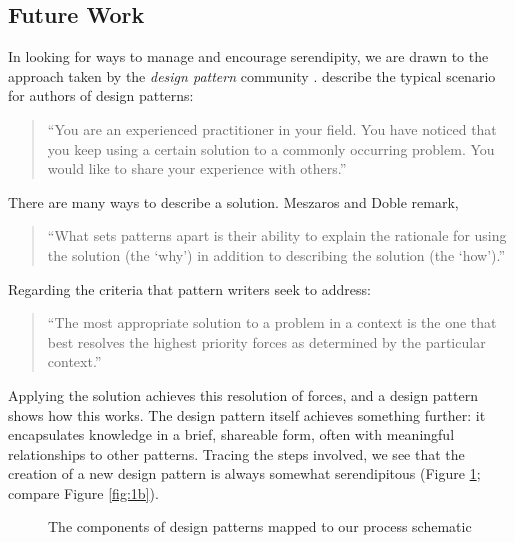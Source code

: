 \subsection{Future Work} \label{sec:futurework} \label{sec:hatching}

In looking for ways to manage and encourage serendipity, we are drawn
to the approach taken by the \emph{design pattern} community
\cite{alexander1999origins}. 
 describe the typical scenario for authors of design patterns:

\begin{quote}
\noindent ``You are an experienced practitioner in your field.  You
have noticed that you keep using a certain solution to a commonly
occurring problem.  You would like to share your experience with
others.''
\end{quote}
There are many ways to describe a solution.
Meszaros and Doble remark,
\begin{quote}
\noindent ``What sets patterns apart is their ability to explain the
rationale for using the solution (the `why') in addition to describing
the solution (the `how').''
\end{quote}
Regarding the criteria that pattern writers seek to address: 
\begin{quote}
\noindent ``The most appropriate solution to a problem in a context is
the one that best resolves the highest priority forces as determined
by the particular context.''
\end{quote}



%
%
Applying the solution achieves this resolution of forces, and a design
pattern shows how this works.  The design pattern itself achieves
something further: it encapsulates knowledge in a brief, shareable
form, often with meaningful relationships to other patterns.  Tracing
the steps involved, we see that the creation of a new design pattern
is always somewhat serendipitous (Figure \ref{fig:pattern-schematic};
compare Figure \ref{fig:1b}).  

\begin{figure}

\caption{The components of design patterns mapped to our process schematic\label{fig:pattern-schematic}}
\end{figure}


